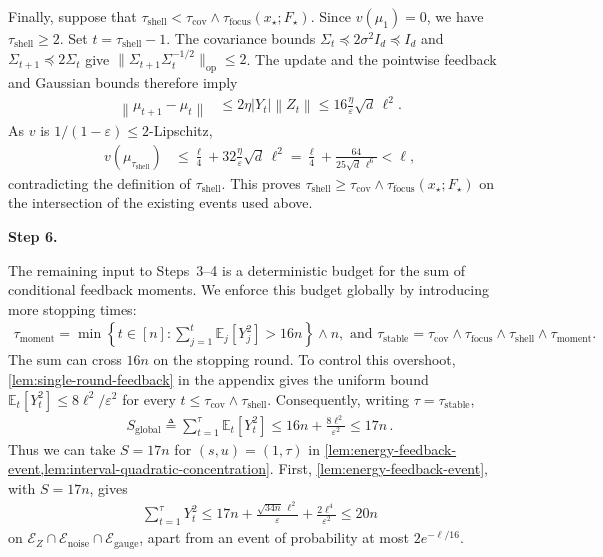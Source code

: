 \documentclass{article}
\newcommand{\proofstepinline}[1]{%
    {\normalfont\normalsize\bfseries\color{blue!55!black}Step #1.}\enspace
}
\newcommand{\E}{\mathbb E}
\newcommand{\op}{\mathrm{op}}
\newcommand{\1}{\mathbf 1}
\newcommand{\eps}{\varepsilon}
\newcommand{\norm}[1]{\left\lVert #1\right\rVert}
\begin{document}
Finally, suppose that
$\tau_{\mathrm{shell}}<\tau_{\mathrm{cov}}
    \wedge\tau_{\mathrm{focus}}(x_\star;F_\star)$.
Since $v(\mu_1)=0$, we have $\tau_{\mathrm{shell}}\geq2$.
Set $t=\tau_{\mathrm{shell}}-1$.
The covariance bounds $\Sigma_t\preceq2\sigma^2I_d\preceq I_d$
and $\Sigma_{t+1}\preceq2\Sigma_t$ give
$\|\Sigma_{t+1}\Sigma_t^{-1/2}\|_{\op}\leq2$.
The update and the pointwise feedback and Gaussian bounds therefore imply
\begin{align}
    \norm{\mu_{t+1}-\mu_t}
     & \leq2\eta|Y_t|\norm{Z_t}
    \leq16\frac{\eta}{\eps}\sqrt d\,\ell^2.
\end{align}
As $v$ is $1/(1-\eps)\leq2$-Lipschitz,
\begin{align}
    v(\mu_{\tau_{\mathrm{shell}}})
     & \leq\frac\ell4+32\frac{\eta}{\eps}\sqrt d\,\ell^2
    =\frac\ell4+\frac{64}{25\sqrt d\,\ell^6}
    <\ell,
\end{align}
contradicting the definition of $\tau_{\mathrm{shell}}$.
This proves $\tau_{\mathrm{shell}}\geq\tau_{\mathrm{cov}}
    \wedge\tau_{\mathrm{focus}}(x_\star;F_\star)$ on the intersection of the
existing events used above.

\newpage
\proofstepinline{6}
The remaining input to Steps~3--4 is a
deterministic budget for the sum of conditional feedback moments.
We enforce this budget globally by introducing more stopping times:
\begin{align}
    \tau_{\mathrm{moment}}
    =\min\left\{t\in[n]:\sum_{j=1}^t\E_j[Y_j^2]>16n\right\}\wedge n,
    \,\,\text{and}\,\,
    \tau_{\mathrm{stable}}
    =\tau_{\mathrm{cov}}\wedge\tau_{\mathrm{focus}}
    \wedge\tau_{\mathrm{shell}}\wedge\tau_{\mathrm{moment}}.
    \label{eq:global-stopping-time}
\end{align}
The sum can cross $16n$ on the stopping round. To control this overshoot,
\cref{lem:single-round-feedback} in the appendix gives the uniform bound
$\E_t[Y_t^2]\leq8\ell^2/\eps^2$ for every
$t\leq\tau_{\mathrm{cov}}\wedge\tau_{\mathrm{shell}}$.
Consequently, writing $\tau=\tau_{\mathrm{stable}}$,
\begin{align}
    S_{\mathrm{global}}\triangleq\sum_{t=1}^{\tau}\E_t[Y_t^2]
    \leq16n+\frac{8\ell^2}{\eps^2}
    \leq17n\,.
    \label{eq:global-moment-budget}
\end{align}
Thus we can take $S=17n$ for $(s,u)=(1,\tau)$ in \cref{lem:energy-feedback-event,lem:interval-quadratic-concentration}.
First, \cref{lem:energy-feedback-event}, with $S=17n$, gives
\begin{align}
    \sum_{t=1}^{\tau}Y_t^2
    \leq17n+\frac{\sqrt{34n}\,\ell^2}{\eps}
    +\frac{2\ell^4}{\eps^2}
    \leq20n
    \label{eq:global-feedback-bound}
\end{align}
on $\mathcal E_Z\cap\mathcal E_{\mathrm{noise}}\cap\mathcal E_{\mathrm{gauge}}$,
apart from an event of probability at most $2e^{-\ell/16}$.
\end{document}

